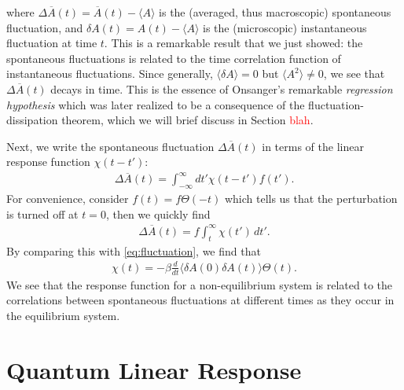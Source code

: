 \documentclass[reprint,
nofootinbib,
amsmath,amssymb,
aps]{revtex4-1}
\newcommand{\be}{\beta}
\newcommand{\f}[2]{\frac{#1}{#2}}
\begin{document}
where $\Delta \overline{A}(t) = \overline{A}(t) - \langle A \rangle$ is the (averaged, thus macroscopic) spontaneous fluctuation, and $\delta A(t) = A(t) - \langle A \rangle$ is the (microscopic) instantaneous fluctuation at time $t$. This is a remarkable result that we just showed: the spontaneous fluctuations is related to the time correlation function of instantaneous fluctuations. Since generally, $\langle \delta A \rangle = 0$ but $\langle A^2 \rangle \neq 0$, we see that $\Delta \overline{A}(t)$ decays in time. This is the essence of Onsanger's remarkable \textit{regression hypothesis} which was later realized to be a consequence of the fluctuation-dissipation theorem, which we will brief discuss in Section \textcolor{red}{blah}.

Next, we write the spontaneous fluctuation $\Delta \overline{A}(t)$ in terms of the linear response function $\chi(t-t')$:
\begin{align}
\label{eq:fluctuation_response_function}
\Delta \overline{A}(t) = \int_{-\infty}^\infty dt' \chi(t-t') f(t'). 
\end{align}
For convenience, consider $f(t) = f \Theta(-t)$ which tells us that the perturbation is turned off at $t=0$, then we quickly find
\begin{align*}
\Delta \overline{A}(t) = f \int_{t}^\infty \chi(t') \,dt'.
\end{align*}
By comparing this with \eqref{eq:fluctuation}, we find that
\begin{align*}
\chi(t) = -\be \f{d}{dt} \langle \delta A(0) \delta A(t) \rangle \Theta(t).
\end{align*}
We see that the response function for a non-equilibrium system is related to the correlations between spontaneous fluctuations at different times as they occur in the equilibrium system.

\section{Quantum Linear Response}
\end{document}
